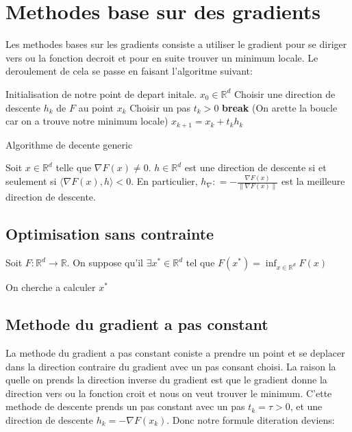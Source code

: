 \section{Methodes base sur des gradients} \label{grad_methods}
Les methodes bases sur les gradients consiste a utiliser le gradient pour se diriger vers ou la fonction decroit et pour en suite trouver un minimum locale. Le deroulement de cela se passe en faisant l'algoritme suivant:
\begin{algorithm}[H]
    \begin{algorithmic}
        \State Initialisation de notre point de depart initale. $x_0 \in \mathbb{R}^d$
            \State Choisir une direction de descente $h_k$ de $F$ au point $x_k$
            \State Choisir un pas $t_k > 0$
                \State \textbf{break} (On arette la boucle car on a trouve notre minimum locale)
            \EndIf
            \State $x_{k+1} = x_k + t_k h_k$
        \EndFor   
    \end{algorithmic}
    \caption{Algorithme de decente generic} %
\end{algorithm}


\begin{lemma} 
Soit $x \in \mathbb{R}^d $ telle que $\nabla F(x) \neq 0$. $h \in \mathbb{R}^d$ est une direction de descente si et seulement si $\langle \nabla F(x), h \rangle < 0$. En particulier, $h_{\nabla} : = -\frac{\nabla F(x)}{\lVert \nabla F(x) \rVert}$ est la meilleure direction de descente.
\end{lemma}


\subsection{Optimisation sans contrainte}

Soit $F:\mathbb{R}^d \rightarrow \mathbb{R}$. On suppose qu'il $\exists  x^* \in \mathbb{R}^d$ tel que $F(x^*) = \inf_{x \in \mathbb{R}^d} F(x)$

On cherche a calculer $x^*$



\subsection{Methode du gradient a pas constant}
La methode du gradient a pas constant coniste a prendre un point et se deplacer dans la direction contraire du gradient avec un pas consant choisi. La raison la quelle on prends la direction inverse du gradient est que le gradient donne la direction vers ou la fonction croit et nous on veut trouver le minimum. C'ette methode de descente prends un pas constant avec un pas $t_k = \tau > 0$, et une direction de descente $ h_k = - \nabla F(x_k)$. Donc notre formule diteration deviens: 


